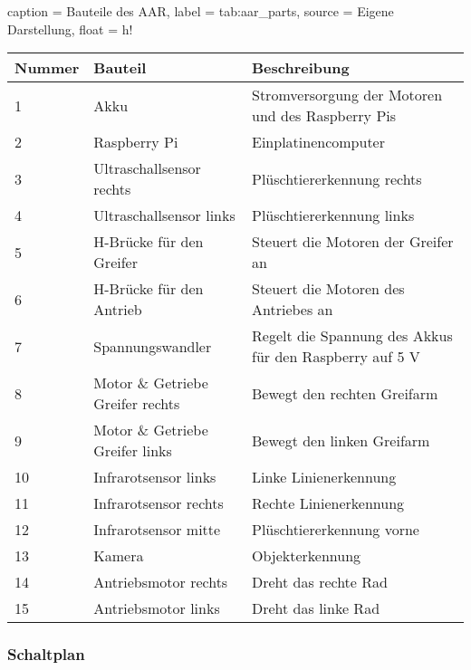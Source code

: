 \begin{dhbwtable}{%
    caption	= Bauteile des \ac{AAR},
    label	= tab:aar_parts,
    source	= Eigene Darstellung,
    float   = h!
}
    \begin{tabularx}{\textwidth}{lXX}
        \toprule
        \textbf{Nummer} & \textbf{Bauteil} & \textbf{Beschreibung} \\\midrule
        1 & Akku                                & Stromversorgung der Motoren und des Raspberry Pis \\
        2 & Raspberry Pi                        & Einplatinencomputer \\
        3 & Ultraschallsensor rechts            & Plüschtiererkennung rechts \\
        4 & Ultraschallsensor links             & Plüschtiererkennung links \\
        5 & H-Brücke für den Greifer            & Steuert die Motoren der Greifer an \\
        6 & H-Brücke für den Antrieb            & Steuert die Motoren des Antriebes an \\
        7 & Spannungswandler                    & Regelt die Spannung des Akkus für den Raspberry auf 5 V \\
        8 & Motor \& Getriebe Greifer rechts    & Bewegt den rechten Greifarm \\
        9 & Motor \& Getriebe Greifer links     & Bewegt den linken Greifarm \\
        10& Infrarotsensor links                & Linke Linienerkennung \\
        11& Infrarotsensor rechts               & Rechte Linienerkennung \\
        12& Infrarotsensor mitte                & Plüschtiererkennung vorne \\
        13& Kamera                              & Objekterkennung \\
        14& Antriebsmotor rechts                & Dreht das rechte Rad \\
        15& Antriebsmotor links                 & Dreht das linke Rad \\\bottomrule
    \end{tabularx}
\end{dhbwtable}

\subsubsection{Schaltplan}

